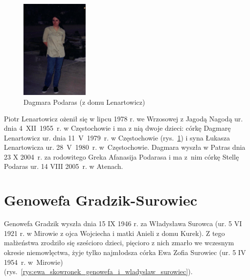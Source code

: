 \begin{figure}[!h]
\begin{center}
\includegraphics[width=0.3\textwidth]{zdjecia/dagmara_lenartowicz_podaras.jpg}
\caption{Dagmara Podaras (z domu Lenartowicz)}
\label{rys:dagmara_lenartowicz_podaras}
\end{center}
\end{figure}

Piotr Lenartowicz ożenił się w lipcu 1978 r. we Wrzosowej z Jagodą Nagodą ur. dnia 4~XII~1955~r. w Częstochowie i ma z nią dwoje dzieci: córkę Dagmarę Lenartowicz ur. dnia 11~V~1979~r. w Częstochowie (rys.~\ref{rys:dagmara_lenartowicz_podaras}) i syna Łukasza Lenartowicza ur. 28~V~1980~r. w~Częstochowie. Dagmara wyszła w Patras dnia 23 X 2004~r. za rodowitego Greka Afanasija Podarasa i ma z~nim córkę Stellę Podaras ur. 14 VIII 2005~r. w Atenach.



\section{Genowefa Gradzik-Surowiec}
Genowefa Gradzik wyszła dnia 15 IX 1946 r. za Władysława Surowca (ur. 5 VI 1921 r. w Mirowie z ojca Wojciecha i matki Anieli z domu Kurek). Z tego małżeństwa zrodziło się sześcioro dzieci, pięcioro z nich zmarło we wczesnym okresie niemowlęctwa, żyje tylko najmłodsza córka Ewa Zofia Surowiec (ur. 5 IV 1954~r. w~Mirowie) (rys.~\ref{rys:ewa_skowronek_genowefa_i_wladyslaw_surowiec}).


